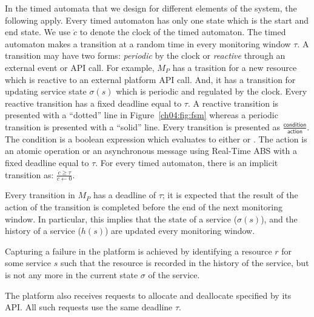 In the timed automata that we design for different elements of the system, the following apply.
Every timed automaton has only one state which is the start and end state.
We use $\dot{c}$ to denote the clock of the timed automaton.
The timed automaton makes a transition at a random time in every monitoring window $\tau$.
A transition may have two forms: \emph{periodic} by the clock or \emph{reactive} through an external event or API call.
For example, $M_P$ has a trasition for  a new resource which is reactive to an external platform API call.
And, it has a transition for updating service state $\sigma(s)$ which is periodic and regulated by the clock. 
Every reactive transition has a fixed deadline equal to $\tau$.
A reactive transition is presented with a ``dotted'' line in Figure~\ref{ch04:fig:fsm} whereas a periodic transition is presented with a ``solid'' line.
Every transition is presented as $\frac{\textsf{condition}}{\textsf{action}}$.
The \textsf{condition} is a boolean expression which evaluates to either  or .
The \textsf{action} is an atomic operation or an asynchronous message using Real-Time ABS with a fixed deadline equal to $\tau$.
For every timed automaton, there is an implicit transition as: $\frac{\dot{c} \geq \tau}{\dot{c} \gets 0}$.

Every transition in $M_P$ has a deadline of $\tau$;
it is expected that the result of the action of the transition is completed before the end of the next monitoring window.
In particular, this implies that the state of a service ($\sigma(s)$), and the history of a service ($h(s)$) are updated every monitoring window.

Capturing a failure in the platform is achieved by identifying a resource $r$ for some service $s$ such that the resource is recorded in the history of the service, but is not any more in the current state $\sigma$ of the service.

The platform also receives requests to allocate and deallocate specified by its API. 
All such requests use the same deadline $\tau$.

